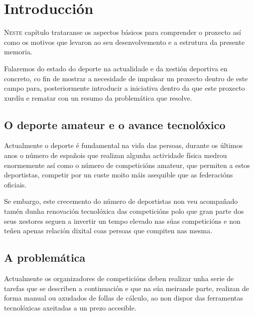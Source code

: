 \chapter{Introducción}
\minitoc


 \lettrine{N}{este} capítulo trataranse os aspectos básicos para comprender o proxecto 
así como os motivos que levaron ao seu desenvolvemento e a estrutura da presente 
memoria.

  Falaremos do estado do deporte na actualidade e da xestión deportiva en 
concreto, co fin de mostrar a necesidade de impulsar un proxecto dentro de este 
campo para, posteriormente introducir a iniciativa dentro da que este
proxecto xurdíu e rematar con un resumo da problemática que resolve.

  \section{O deporte amateur e o avance tecnolóxico}

    Actualmente o deporte é fundamental na vida das persoas, durante os últimos anos o 
número de españois que realizan algunha actividade física medrou enormemente así como o 
número de competicións amateur, que permiten a estos deportistas, competir por un custe 
moito máis asequible que as federacións oficiais.

    Se embargo, este crecemento do número de deportistas non veu acompañado tamén dunha 
renovación tecnolóxica das competicións polo que gran parte dos seus xestores seguen
a invertir un tempo elevado nas súas competicións e non teñen apenas 
relación dixital coas persoas que compiten nas mesma.

    \section{A problemática}
    Actualmente os organizadores de competicións deben realizar unha serie de tarefas que 
se describen a continuación e que na súa meirande parte, realizan de forma manual ou 
axudados de follas de cálculo, ao non dispor das ferramentas tecnolóxicas axeitadas a un 
prezo accesible.

